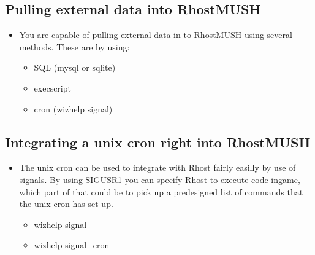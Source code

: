 \documentclass[letterpaper,10pt,english]{sphinxmanual}
\begin{document}
\subsection{Pulling external data into RhostMUSH}
\label{\detokenize{features:pulling-external-data-into-rhostmush}}\begin{itemize}
\item {} 
\sphinxAtStartPar
You are capable of pulling external data in to RhostMUSH using several methods.  These are by using:
\begin{itemize}
\item {} 
\sphinxAtStartPar
SQL (mysql or sqlite)

\item {} 
\sphinxAtStartPar
execscript

\item {} 
\sphinxAtStartPar
cron (wizhelp signal)

\end{itemize}

\end{itemize}


\subsection{Integrating a unix cron right into RhostMUSH}
\label{\detokenize{features:integrating-a-unix-cron-right-into-rhostmush}}\begin{itemize}
\item {} 
\sphinxAtStartPar
The unix cron can be used to integrate with Rhost fairly
easilly by use of signals.  By using SIGUSR1 you can specify
Rhost to execute code in\sphinxhyphen{}game, which part of that could be
to pick up a pre\sphinxhyphen{}designed list of commands that the unix cron
has set up.
\begin{itemize}
\item {} 
\sphinxAtStartPar
wizhelp signal

\item {} 
\sphinxAtStartPar
wizhelp signal\_cron

\end{itemize}

\end{itemize}
\end{document}
